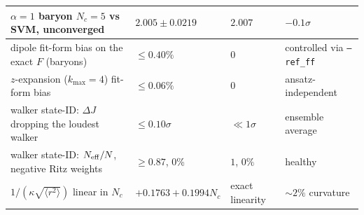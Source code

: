 \begin{tabularx}{\textwidth}{>{\raggedright\arraybackslash}Xlll}
$\alpha=1$ baryon $N_c=5$ vs SVM, unconverged & $2.005\pm0.0219$ & $2.007$ & $-0.1\sigma$ \\
\hline
dipole fit-form bias on the exact $F$ (baryons) & $\le 0.40\%$ & $0$ & controlled via \texttt{--ref\_ff} \\
$z$-expansion ($k_{\max}=4$) fit-form bias & $\le 0.06\%$ & $0$ & ansatz-independent \\
walker state-ID: $\Delta J$ dropping the loudest walker & $\le 0.10\sigma$ & $\ll 1\sigma$ & ensemble average \\
walker state-ID: $N_{\rm eff}/N$, negative Ritz weights & $\ge 0.87$, 0\% & $1$, $0\%$ & healthy \\
$1/(\kappa\sqrt{\langle r^2\rangle})$ linear in $N_c$ & $+0.1763+0.1994N_c$ & exact linearity & $\sim2\%$ curvature \\
\hline\hline
\end{tabularx}
